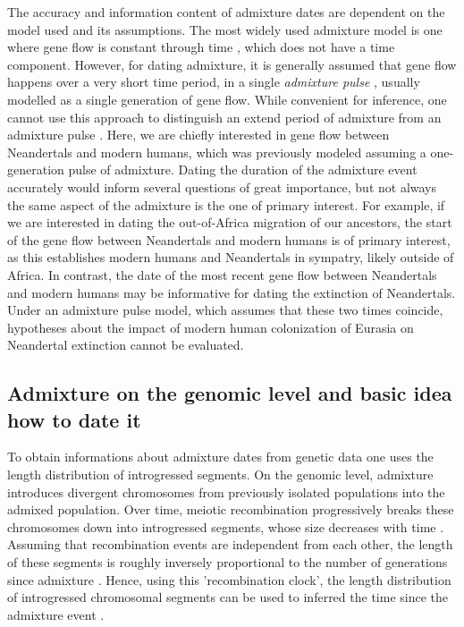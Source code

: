 \documentclass[]{article}
\begin{document}
The accuracy and information content of admixture dates are dependent on the model used and its assumptions.
The most widely used admixture model is one where gene flow is constant through time \citep{nielsen_distinguishing_2001,hey_multilocus_2004}, which does not have a time component. However, for dating admixture, it is generally assumed that gene flow
happens over a very short time period, in a single \textit{admixture pulse} \citep{moorjani_history_2011}, usually modelled as a single generation
of gene flow. While convenient for inference, one cannot use this approach to distinguish an extend period of admixture from an admixture pulse \citep{pickrell_toward_2014}. 
Here, we are chiefly interested in gene flow between Neandertals and modern humans, which was previously modeled assuming a one-generation pulse of admixture. Dating the duration of the admixture event accurately would inform several questions of  great importance, but not always the same aspect of the admixture is the one of primary interest. For example, if we are interested in dating the out-of-Africa migration of our ancestors, the start of the gene flow between Neandertals and modern humans is of primary interest, as this establishes modern humans and Neandertals in sympatry, likely outside of Africa.
In contrast, the date of the most recent gene flow between Neandertals and modern humans may be informative for dating the extinction of Neandertals. Under an admixture pulse model, which assumes that these two times coincide, hypotheses about the impact of modern human colonization of Eurasia on Neandertal extinction cannot be evaluated.

\subsection{Admixture on the genomic level and basic idea how to date
it}\label{admixture-on-the-genomic-level-and-basic-idea-how-to-date-it}
To obtain informations about admixture dates from genetic data one uses the length distribution of introgressed segments.
On the genomic level, admixture introduces  divergent chromosomes from previously isolated populations 
into the admixed population. Over time, meiotic recombination
progressively breaks these chromosomes down into introgressed segments, whose size decreases with time \citep{falush_inference_2003}. 
Assuming that recombination events are
independent from each other, the length of these segments  is roughly inversely proportional to  the number of
generations since admixture
\citep{moorjani_history_2011,pool_inference_2009,gravel_population_2012,liang_lengths_2014}.
Hence, using this 'recombination clock', the length distribution of introgressed chromosomal segments
 can be used to inferred the time since the
admixture event 
\citep{moorjani_history_2011,pugach_dating_2011,sankararaman_date_2012,loh_inferring_2013,sankararaman_combined_2016,pugach_gateway_2018,jacobs_multiple_2019,hellenthal_genetic_2014}.
\end{document}

